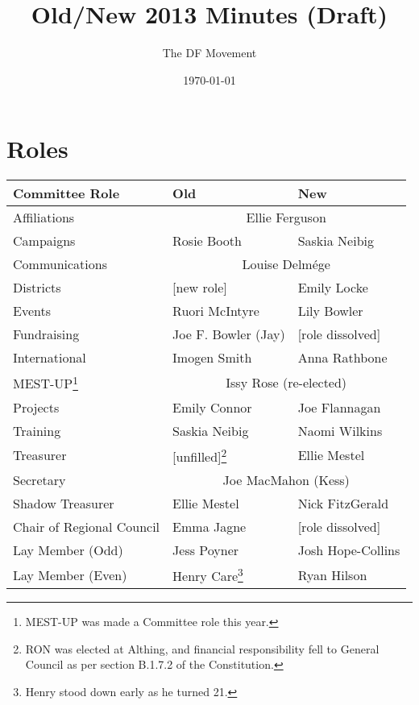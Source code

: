 \documentclass[a4paper, 11pt]{article} %
\title{Old/New 2013 Minutes (Draft)}
\author{The DF Movement}
\date{\today}
\begin{document}
\maketitle

\tableofcontents

\section{Roles}

\begin{savenotes}
\begin{center}
	\begin{tabular}{ l  l  l } \hline \hline
	\textbf{Committee Role}		& \textbf{Old}			& \textbf{New} \\ \hline \hline
	Affiliations				& \multicolumn{2}{c}{Ellie Ferguson} \\ \hline
	Campaigns				& Rosie Booth 			& Saskia Neibig \\ \hline
	Communications			& \multicolumn{2}{c}{Louise Delmége} \\ \hline
	Districts					& [new role]			& Emily Locke \\ \hline
	Events					& Ruori McIntyre 		& Lily Bowler \\ \hline
	Fundraising				& Joe F. Bowler (Jay) 	& [role dissolved] \\ \hline
	International				& Imogen Smith 		& Anna Rathbone \\ \hline
	MEST-UP\footnote{MEST-UP was made a Committee role this year.}	& \multicolumn{2}{c}{Issy Rose (re-elected)} \\ \hline
	Projects					& Emily Connor 		& Joe Flannagan \\ \hline
	Training					& Saskia Neibig 		& Naomi Wilkins \\ \hline
	Treasurer					& [unfilled]\footnote{RON was elected at Althing, and financial responsibility fell to General Council as per section B.1.7.2 of the Constitution.}	& Ellie Mestel \\ \hline
	Secretary					& \multicolumn{2}{c}{Joe MacMahon (Kess)} \\ \hline
	Shadow Treasurer			& Ellie Mestel 			& Nick FitzGerald \\ \hline
	Chair of Regional Council		& Emma Jagne 		& [role dissolved] \\ \hline
	Lay Member (Odd)			& Jess Poyner			& Josh Hope-Collins \\ \hline
	Lay Member (Even)			& Henry Care\footnote{Henry stood down early as he turned 21.}	& Ryan Hilson \\ \hline

\end{tabular}
\end{center}
\end{savenotes}
\end{document}
